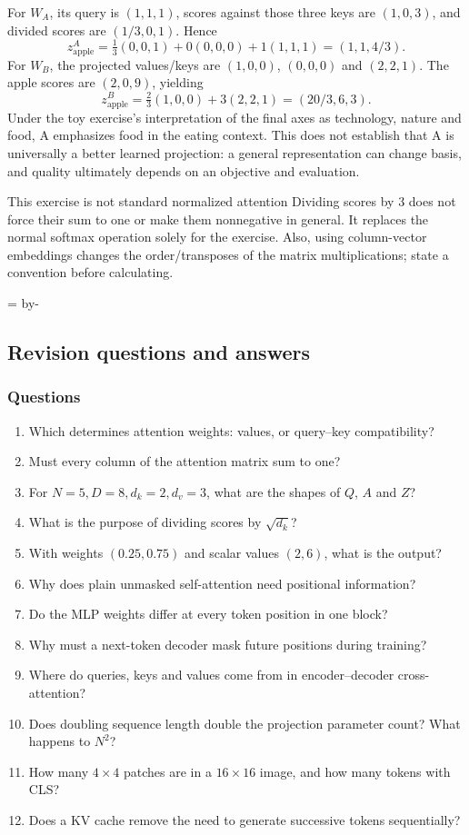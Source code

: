 \documentclass[11pt]{article}
\newcommand{\newsubsection}[1]{\par\begingroup\skip0=\pagegoal\advance\skip0 by-\pagetotal\ifdim\skip0<12\baselineskip\newpage\fi\endgroup\subsection{#1}}
\begin{document}
For $W_A$, its query is $(1,1,1)$, scores against those three keys are $(1,0,3)$, and divided scores are $(1/3,0,1)$. Hence
\[
z_{\mathrm{apple}}^{A}
=\tfrac13(0,0,1)+0(0,0,0)+1(1,1,1)
=(1,1,4/3).
\]
For $W_B$, the projected values/keys are $(1,0,0)$, $(0,0,0)$ and $(2,2,1)$. The apple scores are $(2,0,9)$, yielding
\[
z_{\mathrm{apple}}^{B}
=\tfrac23(1,0,0)+3(2,2,1)
=(20/3,6,3).
\]
Under the toy exercise's interpretation of the final axes as technology, nature and food, A emphasizes food in the eating context. This does not establish that A is universally a better learned projection: a general representation can change basis, and quality ultimately depends on an objective and evaluation.
\begin{careful}{This exercise is not standard normalized attention}
Dividing scores by 3 does not force their sum to one or make them nonnegative in general. It replaces the normal softmax operation solely for the exercise. Also, using column-vector embeddings changes the order/transposes of the matrix multiplications; state a convention before calculating.
\end{careful}

\newsubsection{Revision questions and answers}
\subsubsection{Questions}
\begin{enumerate}
\item Which determines attention weights: values, or query--key compatibility?
\item Must every column of the attention matrix sum to one?
\item For $N=5,D=8,d_k=2,d_v=3$, what are the shapes of $Q$, $A$ and $Z$?
\item What is the purpose of dividing scores by $\sqrt{d_k}$?
\item With weights $(0.25,0.75)$ and scalar values $(2,6)$, what is the output?
\item Why does plain unmasked self-attention need positional information?
\item Do the MLP weights differ at every token position in one block?
\item Why must a next-token decoder mask future positions during training?
\item Where do queries, keys and values come from in encoder--decoder cross-attention?
\item Does doubling sequence length double the projection parameter count? What happens to $N^2$?
\item How many $4\times4$ patches are in a $16\times16$ image, and how many tokens with CLS?
\item Does a KV cache remove the need to generate successive tokens sequentially?
\end{enumerate}
\end{document}
